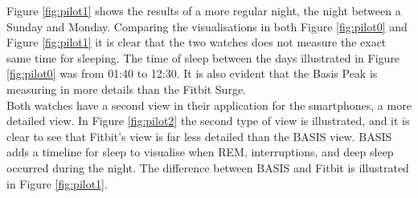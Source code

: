 \documentclass[12pt]{article} %
\begin{document}
Figure \ref{fig:pilot1} shows the results of a more regular night, the night between a Sunday and Monday. Comparing the visualisations in both Figure \ref{fig:pilot0} and Figure \ref{fig:pilot1} it is clear that the two watches does not measure the exact same time for sleeping. The time of sleep between the days illustrated in Figure \ref{fig:pilot0} was from 01:40 to 12:30. It is also evident that the Basis Peak is measuring in more details than the Fitbit Surge. \\

Both watches have a second view in their application for the smartphones, a more detailed view. In Figure \ref{fig:pilot2} the second type of view is illustrated, and it is clear to see that Fitbit's view is far less detailed than the BASIS view. BASIS adds a timeline for sleep to visualise when REM, interruptions, and deep sleep occurred during the night. The difference between BASIS and Fitbit is illustrated in Figure \ref{fig:pilot1}.
\end{document}
